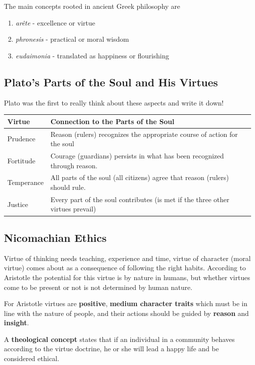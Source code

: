 \documentclass[11pt]{article}
\theoremstyle{definition}
\begin{document}
The main concepts rooted in ancient Greek philosophy are
\begin{enumerate}
	\item \emph{arête} - excellence or virtue
	\item \emph{phronesis} - practical or moral wisdom
	\item \emph{eudaimonia} - translated as happiness or flourishing
\end{enumerate}

\subsection{Plato's Parts of the Soul and His Virtues}
Plato was the first to really think about these aspects and write it down!
\begin{tabularx}{\linewidth}{|l|l|}
	\hline
	\textbf{Virtue} & \textbf{Connection to the Parts of the Soul}\\
	\hline
	Prudence & Reason (rulers) recognizes the appropriate course of action for the soul \\
	Fortitude & Courage (guardians) persists in what has been recognized through reason. \\
	Temperance & All parts of the soul (all citizens) agree that reason (rulers) should rule. \\
	Justice & Every part of the soul contributes (is met if the three other virtues prevail) \\
	\hline
\end{tabularx}

\subsection{Nicomachian Ethics}
Virtue of thinking needs teaching, experience and time, virtue of character (moral virtue) comes about as a consequence of following the right habits. According to Aristotle the potential for this virtue is by nature in humans, but whether virtues come to be present or not is not determined by human nature.

For Aristotle virtues are \textbf{positive}, \textbf{medium character traits} which must be in line with the nature of people, and their actions should be guided by \textbf{reason} and \textbf{insight}.

\begin{definition}
	A \textbf{theological concept} states that if an individual in a community behaves according to the virtue doctrine, he or she will lead a happy life and be considered ethical.
\end{definition}
\end{document}
